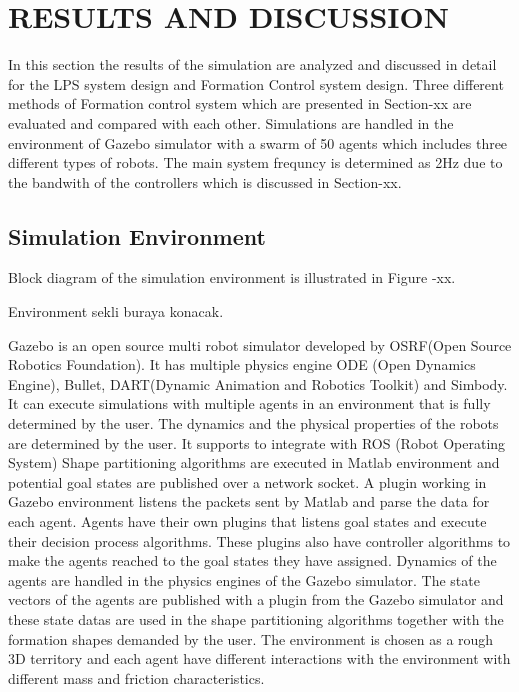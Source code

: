 \documentclass[twoside]{article}
\begin{document}
\section{RESULTS AND DISCUSSION}	
	
	In this section the results of the simulation are analyzed and discussed in detail for the LPS system design and Formation Control system design. Three different methods of Formation control system which are presented in Section-xx are evaluated and compared with each other. Simulations are handled in the environment of Gazebo simulator with a swarm of 50 agents which includes three different types of robots. The main system frequncy is determined as 2Hz due to the bandwith of the controllers which is discussed in Section-xx. 
	\subsection{Simulation Environment}
    Block diagram of the simulation environment is illustrated in Figure -xx.
    
    Environment sekli buraya konacak.
    
	Gazebo is an open source multi robot simulator developed by OSRF(Open Source Robotics Foundation). It has multiple physics engine ODE (Open Dynamics Engine), Bullet, DART(Dynamic Animation and Robotics Toolkit) and Simbody. It can execute simulations with multiple agents in an environment that is fully determined by the user. The dynamics and the physical properties of the robots are determined by the user. It supports to integrate with ROS (Robot Operating System)
    Shape partitioning algorithms are executed in Matlab environment and  potential goal states are published over a network socket. A plugin working in Gazebo environment listens the packets sent by Matlab and parse the data for each agent. Agents have their own plugins that listens goal states and execute their decision process algorithms. These plugins also have controller algorithms to make the agents reached to the goal states they have assigned. Dynamics of the agents are handled in the physics engines of the Gazebo simulator. The state vectors of the agents are published with a plugin from the Gazebo simulator and these state datas are used in the shape partitioning algorithms together with the formation shapes demanded by the user.   The environment is chosen as a rough 3D territory and each agent have different interactions with the environment with different mass and friction characteristics.
    
\end{document}
